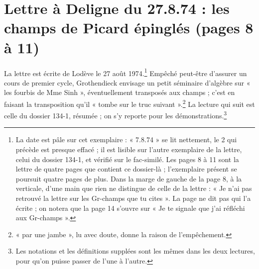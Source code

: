 \documentclass[11pt,a4paper]{article}
\begin{document}
\section*{Lettre à Deligne du 27.8.74 : les champs de Picard épinglés (pages 8 à 11)}

La lettre est écrite de Lodève le 27 août 1974.\footnote{La date est pâle sur
cet exemplaire : « 7.8.74 » se lit nettement, le 2 qui précède est presque
effacé ; il est lisible sur l'autre exemplaire de la lettre, celui du dossier
134-1, et vérifié sur le fac-similé. Les pages 8 à 11 sont la lettre de
quatre pages que contient ce dossier-là ; l'exemplaire présent se poursuit
quatre pages de plus. Dans la marge de gauche de la page 8, à la verticale,
d'une main que rien ne distingue de celle de la lettre : « Je n'ai pas
retrouvé la lettre sur les Gr-champs que tu cites ». La page ne dit pas qui
l'a écrite ; on notera que la page 14 s'ouvre sur « Je te signale que j'ai
réfléchi aux Gr-champs ».} Empêché peut-être d'assurer un cours de premier
cycle, Grothendieck envisage un petit séminaire d'algèbre sur « les fourbis
de Mme Sinh », éventuellement transposés aux champs ; c'est en faisant la
transposition qu'il « tombe sur le truc suivant ».\footnote{« par une jambe »,
lu avec doute, donne la raison de l'empêchement.} La lecture qui suit est
celle du dossier 134-1, résumée ; on s'y reporte pour les
démonstrations.\footnote{Les notations et les définitions supplées sont les
mêmes dans les deux lectures, pour qu'on puisse passer de l'une à l'autre.}
\end{document}
